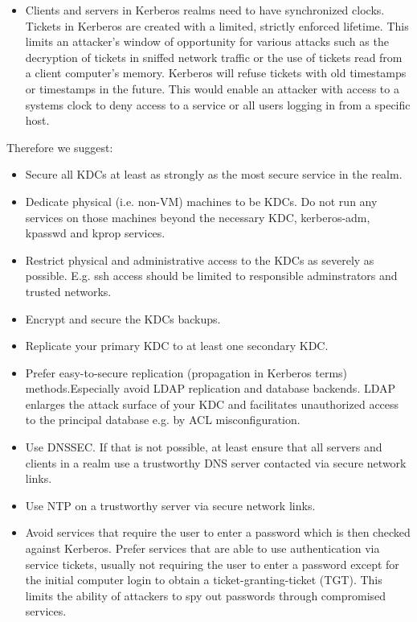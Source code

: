 \begin{itemize}
	\item Clients and servers in Kerberos realms need to have synchronized clocks. Tickets in Kerberos are created with a limited, strictly enforced lifetime. This limits an attacker's window of opportunity for various attacks such as the decryption of tickets in sniffed network traffic or the use of tickets read from a client computer's memory. Kerberos will refuse tickets with old timestamps or timestamps in the future. This would enable an attacker with access to a systems clock to deny access to a service or all users logging in from a specific host.
\end{itemize}

Therefore we suggest:
\begin{itemize}
	\item Secure all KDCs at least as strongly as the most secure service in the realm.
	\item Dedicate physical (i.e. non-VM) machines to be KDCs. Do not run any services on those machines beyond the necessary KDC, kerberos-adm, kpasswd and kprop services. 
	\item Restrict physical and administrative access to the KDCs as severely as possible. E.g. ssh access should be limited to responsible adminstrators and trusted networks. 
	\item Encrypt and secure the KDCs backups.
	\item Replicate your primary KDC to at least one secondary KDC.
	\item Prefer easy-to-secure replication (propagation in Kerberos terms) methods.Especially avoid LDAP replication and database backends. LDAP enlarges the attack surface of your KDC and facilitates unauthorized access to the principal database e.g. by ACL misconfiguration.
	\item Use DNSSEC.  If that is not possible, at least ensure that all servers and clients in a realm use a trustworthy DNS server contacted via secure network links.
	\item Use NTP on a trustworthy server via secure network links. 
	\item Avoid services that require the user to enter a password which is then checked against Kerberos. Prefer services that are able to use authentication via service tickets, usually not requiring the user to enter a password except for the initial computer login to obtain a ticket-granting-ticket (TGT). This limits the ability of attackers to spy out passwords through compromised services.
\end{itemize}

